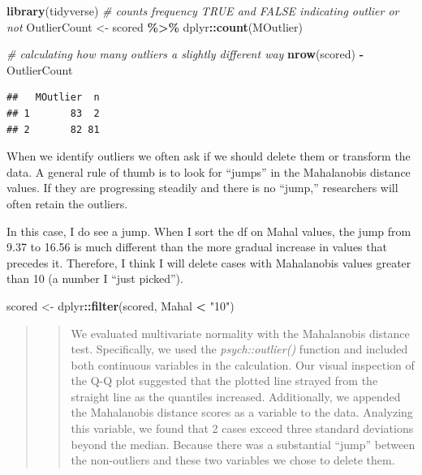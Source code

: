 \documentclass[
  11pt,
]{book}
\newenvironment{Shaded}{\begin{snugshade}}{\end{snugshade}}
\newcommand{\CommentTok}[1]{\textcolor[rgb]{0.37,0.37,0.37}{\textit{#1}}}
\newcommand{\FunctionTok}[1]{\textcolor[rgb]{0.27,0.27,0.27}{\textbf{#1}}}
\newcommand{\NormalTok}[1]{#1}
\newcommand{\OtherTok}[1]{\textcolor[rgb]{0.37,0.37,0.37}{#1}}
\newcommand{\SpecialCharTok}[1]{\textcolor[rgb]{0.43,0.43,0.43}{\textbf{#1}}}
\newcommand{\StringTok}[1]{\textcolor[rgb]{0.5,0.5,0.5}{#1}}
\begin{document}
\begin{Shaded}
\begin{Highlighting}[]
\FunctionTok{library}\NormalTok{(tidyverse)}
\CommentTok{\# counts frequency TRUE and FALSE indicating outlier or not}
\NormalTok{OutlierCount }\OtherTok{\textless{}{-}}\NormalTok{ scored }\SpecialCharTok{\%\textgreater{}\%}
\NormalTok{    dplyr}\SpecialCharTok{::}\FunctionTok{count}\NormalTok{(MOutlier)}

\CommentTok{\# calculating how many outliers a slightly different way}
\FunctionTok{nrow}\NormalTok{(scored) }\SpecialCharTok{{-}}\NormalTok{ OutlierCount}
\end{Highlighting}
\end{Shaded}

\begin{verbatim}
##   MOutlier  n
## 1       83  2
## 2       82 81
\end{verbatim}

When we identify outliers we often ask if we should delete them or transform the data. A general rule of thumb is to look for ``jumps'' in the Mahalanobis distance values. If they are progressing steadily and there is no ``jump,'' researchers will often retain the outliers.

In this case, I do see a jump. When I sort the df on Mahal values, the jump from 9.37 to 16.56 is much different than the more gradual increase in values that precedes it. Therefore, I think I will delete cases with Mahalanobis values greater than 10 (a number I ``just picked'').

\begin{Shaded}
\begin{Highlighting}[]
\NormalTok{scored }\OtherTok{\textless{}{-}}\NormalTok{ dplyr}\SpecialCharTok{::}\FunctionTok{filter}\NormalTok{(scored, Mahal }\SpecialCharTok{\textless{}} \StringTok{"10"}\NormalTok{)}
\end{Highlighting}
\end{Shaded}

\begin{quote}
\begin{quote}
We evaluated multivariate normality with the Mahalanobis distance test. Specifically, we used the \emph{psych::outlier()} function and included both continuous variables in the calculation. Our visual inspection of the Q-Q plot suggested that the plotted line strayed from the straight line as the quantiles increased. Additionally, we appended the Mahalanobis distance scores as a variable to the data. Analyzing this variable, we found that 2 cases exceed three standard deviations beyond the median. Because there was a substantial ``jump'' between the non-outliers and these two variables we chose to delete them.
\end{quote}
\end{quote}
\end{document}
